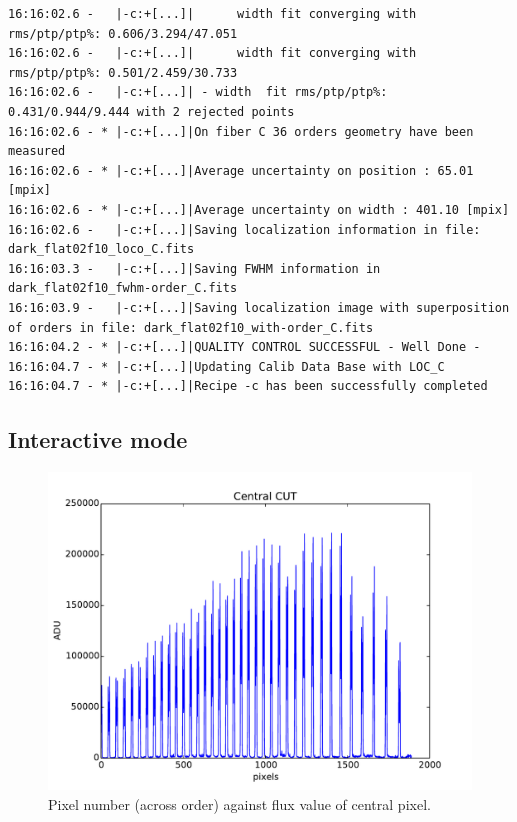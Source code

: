 \begin{lstlisting}[style=text]
16:16:02.6 -   |-c:+[...]|      width fit converging with rms/ptp/ptp%: 0.606/3.294/47.051
16:16:02.6 -   |-c:+[...]|      width fit converging with rms/ptp/ptp%: 0.501/2.459/30.733
16:16:02.6 -   |-c:+[...]| - width  fit rms/ptp/ptp%: 0.431/0.944/9.444 with 2 rejected points
16:16:02.6 - * |-c:+[...]|On fiber C 36 orders geometry have been measured 
16:16:02.6 - * |-c:+[...]|Average uncertainty on position : 65.01 [mpix]
16:16:02.6 - * |-c:+[...]|Average uncertainty on width : 401.10 [mpix]
16:16:02.6 -   |-c:+[...]|Saving localization information in file: dark_flat02f10_loco_C.fits
16:16:03.3 -   |-c:+[...]|Saving FWHM information in dark_flat02f10_fwhm-order_C.fits
16:16:03.9 -   |-c:+[...]|Saving localization image with superposition of orders in file: dark_flat02f10_with-order_C.fits
16:16:04.2 - * |-c:+[...]|QUALITY CONTROL SUCCESSFUL - Well Done -
16:16:04.7 - * |-c:+[...]|Updating Calib Data Base with LOC_C
16:16:04.7 - * |-c:+[...]|Recipe -c has been successfully completed

\end{lstlisting}

\subsection{Interactive mode}

\begin{figure}
\begin{center}
\includegraphics[width=.8\textwidth]{figures/cal_loc_RAW_spirou_1.pdf}
\caption{Pixel number (across order) against flux value of central pixel. \label{figure:cal_loc_RAW_spirou_1}}
\end{center}
\end{figure}

